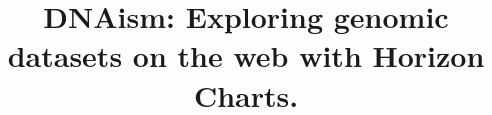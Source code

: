 \documentclass{bmcart}
\begin{document}
\begin{frontmatter}

\begin{fmbox}

\title{DNAism: Exploring genomic datasets on the web with Horizon Charts. }


\author[
   addressref={aff1},                   %
   corref={aff1},                       %
   email={deiros@bcm.edu}   %
]{ }
\author[
   addressref={aff1,aff2},
   email={deiros@bcm.edu}
]{ }
\author[
   addressref={aff1,aff2},
   email={deiros@bcm.edu}
]{ }


\address[id=aff1]{%
  , %
  ,                     %
  ,                              %
}

\address[id=aff2]{%
  ,
  ,                     %
  ,                              %
}




\end{fmbox}
\end{frontmatter}
\end{document}
